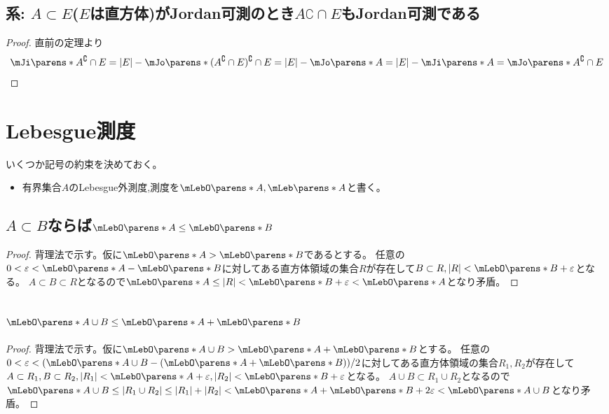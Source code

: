         \subsection{系: \texorpdfstring{$A\subset E$}{A⊂E}(\texorpdfstring{$E$}{E}は直方体)がJordan可測のとき\texorpdfstring{$A\complement\cap E$}{A\string^∁ ∩ E}もJordan可測である}
            \label{subsec: Jordan可測集合の補集合もJordan可測}
            \begin{proof}
                直前の定理より
                \[ \mJi\parens*{A^\complement\cap E} = |E| - \mJo\parens*{(A^\complement\cap E)^\complement\cap E} = |E| - \mJo\parens*{A} = |E| - \mJi\parens*{A} = \mJo\parens*{A^\complement\cap E} \]
            \end{proof}
    \section{Lebesgue測度}
        いくつか記号の約束を決めておく。
        \begin{itemize}
            \item 有界集合$A$のLebesgue外測度,測度を$\mLebO\parens*{A}, \mLeb\parens*{A}$と書く。
        \end{itemize}
        \subsection{\texorpdfstring{$A\subset B$}{A⊂B}ならば\texorpdfstring{$\mLebO\parens*{A}\leq\mLebO\parens*{B}$}{mLo(A)<mLo(B)}}
            \begin{proof}
                背理法で示す。仮に$\mLebO\parens*{A} > \mLebO\parens*{B}$であるとする。
                任意の$0 < \varepsilon < \mLebO\parens*{A} - \mLebO\parens*{B}$に対してある直方体領域の集合$R$が存在して$B\subset R,|R| < \mLebO\parens*{B} + \varepsilon$となる。
                $A\subset B\subset R$となるので$\mLebO\parens*{A} \leq |R| < \mLebO\parens*{B} + \varepsilon < \mLebO\parens*{A}$となり矛盾。
            \end{proof}
        \subsection{\texorpdfstring{$\mLebO\parens*{A\cup B}\leq\mLebO\parens*{A} + \mLebO\parens*{B}$}{mLo(A∪B)≤mLo(A)+mLo(B)}}
            \begin{proof}
                背理法で示す。仮に$\mLebO\parens*{A\cup B} > \mLebO\parens*{A} + \mLebO\parens*{B}$とする。
                任意の$0 < \varepsilon < (\mLebO\parens*{A\cup B} - (\mLebO\parens*{A} + \mLebO\parens*{B}))/2$に対してある直方体領域の集合$R_1,R_2$が存在して$A\subset R_1, B\subset R_2,|R_1|<\mLebO\parens*{A} + \varepsilon,|R_2| < \mLebO\parens*{B} + \varepsilon$となる。
                $A\cup B \subset R_1\cup R_2$となるので$\mLebO\parens*{A\cup B} \leq |R_1\cup R_2| \leq |R_1|+|R_2| < \mLebO\parens*{A} + \mLebO\parens*{B} + 2\varepsilon < \mLebO\parens*{A\cup B}$となり矛盾。
            \end{proof}
